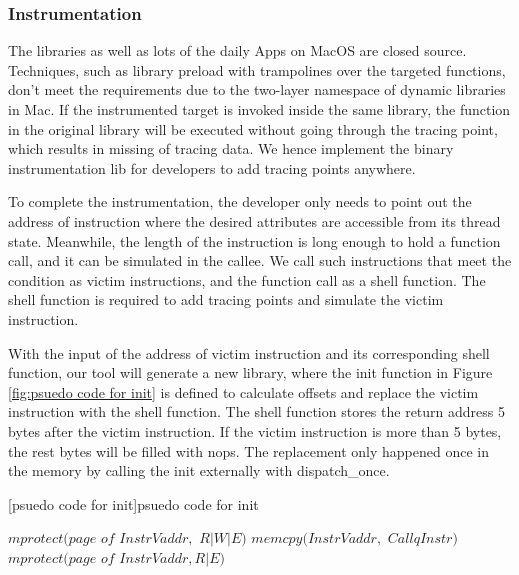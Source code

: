 \subsubsection{Instrumentation}
The libraries as well as lots of the daily Apps on MacOS are closed source.
Techniques, such as library preload with trampolines over the targeted functions, don't meet the requirements due to the two-layer namespace of dynamic libraries in Mac.
If the instrumented target is invoked inside the same library,
the function in the original library will be executed without going through the tracing point,
which results in missing of tracing data.
We hence implement the binary instrumentation lib for developers to add tracing points anywhere.\par
To complete the instrumentation, the developer only needs to point out the address of instruction where the desired attributes are accessible from its thread state.
Meanwhile, the length of the instruction is long enough to hold a function call, and it can be simulated in the callee.
We call such instructions that meet the condition as victim instructions, and the function call as a shell function.
The shell function is required to add tracing points and simulate the victim instruction.\par
With the input of the address of victim instruction and its corresponding shell function, our tool will generate a new library, 
 where the init function in Figure \ref{fig:psuedo code for init} is defined to calculate offsets and replace the victim instruction with the shell function.
The shell function stores the return address 5 bytes after the victim instruction.
If the victim instruction is more than 5 bytes, the rest bytes will be filled with nops.
The replacement only happened once in the memory by calling the init externally with dispatch\_once.
\begin{algorithm}
[psuedo code for init]{psuedo code for init}
\begin{algorithmic}[1]
\State $mprotect(page$ $of$ $InstrVaddr,$ $R|W|E)$
\State $memcpy(InstrVaddr,$ $CallqInstr)$
\State $mprotect(page$ $of$ $InstrVaddr, R|E)$
\EndFor
\EndProcedure
\end{algorithmic}
\label {fig:psuedo code for init}
\end{algorithm}

